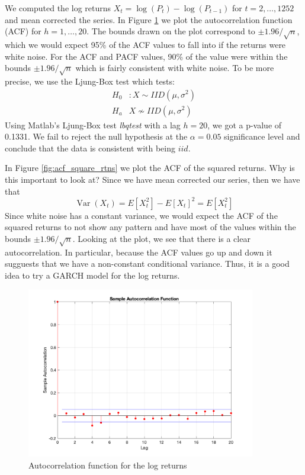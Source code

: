 \documentclass{article}
\DeclareMathOperator{\Var}{Var}
\begin{document}
We computed the log returns $X_t = \log(P_t) - \log(P_{t - 1})$ for $t = 2,\ldots, 1252$ and mean corrected the series.
In Figure \ref{fig:acf_log_rtns} we plot the autocorrelation function (ACF) for $h = 1,\ldots, 20$.
The bounds drawn on the plot correspond to $\pm 1.96/\sqrt{n}$, which we would expect 95\% of the ACF values to fall into if the returns were white noise.
For the ACF and PACF values, 90\% of the value were within the bounds $\pm 1.96/\sqrt{n}$ which is fairly consistent with white noise.
To be more precise, we use the Ljung-Box test which tests:
\begin{align*}
H_0&: X \sim IID(\mu, \sigma^2)\\
H_a& X \not \sim IID(\mu, \sigma^2)
\end{align*}
Using Matlab's Ljung-Box test \textit{lbqtest} with a lag $h = 20$, we got a p-value of 0.1331.
We fail to reject the null hypothesis at the $\alpha = 0.05$ significance level and conclude that the data is consistent with being $iid$.

In Figure \ref{fig:acf_square_rtns} we plot the ACF of the squared returns.
Why is this important to look at?
Since we have mean corrected our series, then we have that
$$
\Var(X_t) = E[X_t^2] - E[X_t]^2 = E[X_t^2]
$$
Since white noise has a constant variance, we would expect the ACF of the squared returns to not show any pattern and have most of the values within the bounds $\pm 1.96/\sqrt{n}$.
Looking at the plot, we see that there is a clear autocorrelation.
In particular, because the ACF values go up and down it sugguests that we have a non-constant conditional variance.
Thus, it is a good idea to try a GARCH model for the log returns.

\begin{figure}[H]
\includegraphics[width=10cm]{plots/acf_log_rtns.png}
\centering
\caption{Autocorrelation function for the log returns}
\label{fig:acf_log_rtns}
\end{figure}
\end{document}
